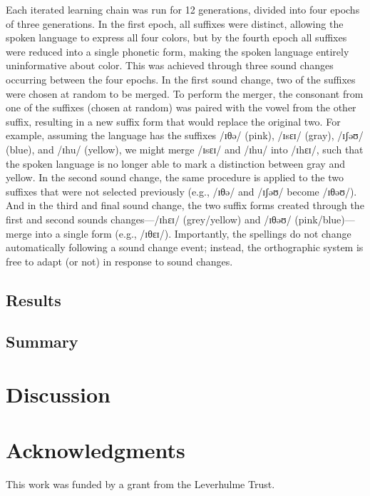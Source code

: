 \documentclass[doc,biblatex]{apa7}
\begin{document}
Each iterated learning chain was run for 12 generations, divided into four epochs of three generations. In the first epoch, all suffixes were distinct, allowing the spoken language to express all four colors, but by the fourth epoch all suffixes were reduced into a single phonetic form, making the spoken language entirely uninformative about color. This was achieved through three sound changes occurring between the four epochs. In the first sound change, two of the suffixes were chosen at random to be merged. To perform the merger, the consonant from one of the suffixes (chosen at random) was paired with the vowel from the other suffix, resulting in a new suffix form that would replace the original two. For example, assuming the language has the suffixes /ɪθə/ (pink), /ɪsɛɪ/ (gray), /ɪʃəʊ/ (blue), and /ɪhu/ (yellow), we might merge /ɪsɛɪ/ and /ɪhu/ into /ɪhɛɪ/, such that the spoken language is no longer able to mark a distinction between gray and yellow. In the second sound change, the same procedure is applied to the two suffixes that were not selected previously (e.g., /ɪθə/ and /ɪʃəʊ/ become /ɪθəʊ/). And in the third and final sound change, the two suffix forms created through the first and second sounds changes---/ɪhɛɪ/ (grey/yellow) and /ɪθəʊ/ (pink/blue)---merge into a single form (e.g., /ɪθɛɪ/). Importantly, the spellings do not change automatically following a sound change event; instead, the orthographic system is free to adapt (or not) in response to sound changes.

\subsection{Results}



\subsection{Summary}


\section{Discussion}


\section{Acknowledgments}

\noindent This work was funded by a grant from the Leverhulme Trust.

\printbibliography
\end{document}
